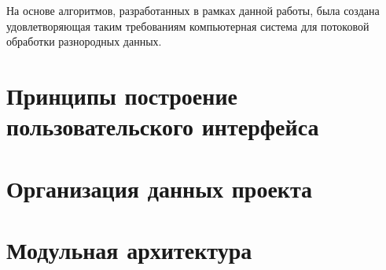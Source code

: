 На основе алгоритмов, разработанных в рамках данной работы, была создана
удовлетворяющая таким требованиям компьютерная система для потоковой
обработки разнородных данных.

\section{Принципы построение пользовательского интерфейса}

\section{Организация данных проекта}

\section{Модульная архитектура}

\clearpage